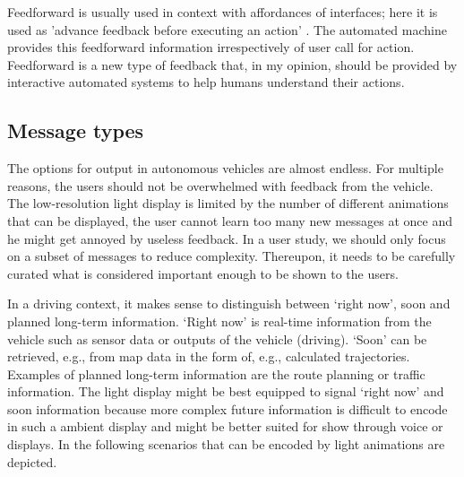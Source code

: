 Feedforward is usually used in context with affordances of interfaces; here it is used as 'advance feedback before executing an action' \citep[see][]{Koo2015}. The automated machine provides this feedforward information irrespectively of user call for action. 
Feedforward is a new type of feedback that, in my opinion, should be provided by interactive automated systems to help humans understand their actions. 

\subsection{Message types}
The options for output in autonomous vehicles are almost endless. For multiple reasons, the users should not be overwhelmed with feedback from the vehicle. The low-resolution light display is limited by the number of different animations that can be displayed, the user cannot learn too many new messages at once and he might get annoyed by useless feedback. In a user study, we should only focus on a subset of messages to reduce complexity. Thereupon, it needs to be carefully curated what is considered important enough to be shown to the users.

In a driving context, it makes sense to distinguish between ‘right now’, soon and planned long-term information. ‘Right now’ is real-time information from the vehicle such as sensor data or outputs of the vehicle (driving). ‘Soon’ can be retrieved, e.g., from map data in the form of, e.g., calculated trajectories. Examples of planned long-term information are the route planning or traffic information. The light display might be best equipped to signal ‘right now’ and soon information because more complex future information is difficult to encode in such a ambient display and might be better suited for show through voice or displays. In the following scenarios that can be encoded by light animations are depicted. 

